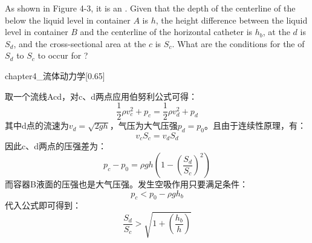\begin{solution}[流体动力学]
	As shown in Figure 4-3, it is an . Given that the depth of the centerline of the  below the liquid level in container $A$ is $h$, 
	the height difference between the liquid level in container $B$ and the centerline of the horizontal catheter is $h_b$,  at the  $d$ is $S_d$, 
	and the cross-sectional area at the  $c$ is $S_c$. What are the conditions for the  of $S_d$ to $S_c$ to occur for ?
	\begin{singlefigure}[流体动力学]{chapter4_流体动力学}[0.65]
	\end{singlefigure}
	
	\tcbrule
	
    取一个流线Acd，对c、d两点应用伯努利公式可得：
        \[\dfrac{1}{2}\rho v_c^2+p_c=\dfrac{1}{2}\rho v_d^2+p_d\]
    其中d点的流速为$v_d=\sqrt{2gh}$，气压为大气压强$p_d=p_0$。且由于连续性原理，有：
        \[v_c S_c=v_d S_d\]
    因此c、d两点的压强差为：
        \[p_c-p_0=\rho gh(1-(\dfrac{S_d}{S_c})^2)\]
    而容器B液面的压强也是大气压强。发生空吸作用只要满足条件：
        \[p_c<p_0-\rho gh_b\]
    代入公式即可得到：
        \[\dfrac{S_d}{S_c}>\sqrt{1+(\dfrac{h_b}{h})}\]
\end{solution}